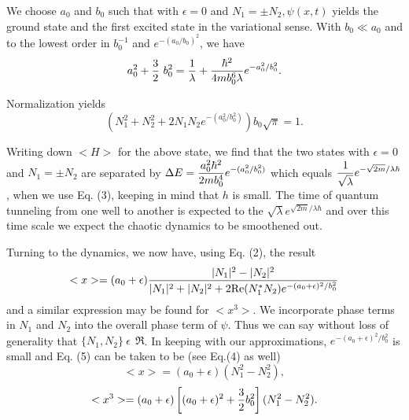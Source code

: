 We choose $a_0$ and $b_0$ such that with $\epsilon = 0$ and $N_1 = \pm 
N_2, \psi (x,t)$ yields the ground state and the first excited state
in the variational sense. With $b_0 \ll a_0$ and to the lowest order
in $b^{-1}_0$ and $e^{-(a_0/b_0)^2}$, we have 
\begin{equation}
a^2_0 + {3\over 2} \ b^2_0 = {1\over \lambda} + {\hbar^2 \over
4 m b^6_0 \lambda} e^{- a^2_0/b^2_0} .
\end{equation}

Normalization yields
\begin{equation}
(N^2_1 + N^2_2 + 2N_1 N_2 e^{- (a^2_0/b^2_0)}) b_0 \sqrt{\pi} = 
1 .
\end{equation}

Writing down $<H>$ for the above state, we find that the two states
with $\epsilon = 0$ and $N_1 = \pm N_2$ are separated by $\Delta E =
\displaystyle{{a^2_0 \hbar^2 \over 2m b_0^4} e^{-(a^2_0/b^2_0)}}$ which equals
$\displaystyle{{1\over \sqrt{\lambda}} e^{- \sqrt{2m}/\lambda\hbar}}$,
when we use 
Eq. (3), keeping in mind that $h$ is small. The time of quantum
tunneling from one well to another is expected to the $\sqrt{\lambda}
e^{\sqrt{2m}/\lambda\hbar}$ and over this time scale we expect the
chaotic dynamics to be smoothened out. 

Turning to the dynamics, we now have, using Eq. (2), the result
\begin{equation}
<x> = (a_0 + \epsilon) {|N_1|^2 - |N_2|^2 \over |N_1|^2 + |N_2|^2 + 2
{\rm Re} (N_1^\ast N_2) e^{-(a_0 +\epsilon)^2 /b_0^2}}
\end{equation}
and a similar expression may be found for $<x^3>$. We incorporate
phase terms in $N_1$ and $N_2$ into the overall phase term of
$\psi$. Thus we can say without loss of generality that $\{N_1, N_2\} \
\epsilon \ \ \Re$. In keeping with our approximations, $e^{-(a_0 
+ \epsilon)^2/b^2_0}$ is small and Eq. (5) can be taken to be (see
Eq.(4) as well)
\subequations
\begin{equation}
<x> = (a_0 + \epsilon) (N_1^2 - N_2^2) , 
\end{equation}
\begin{equation}
<x^3> = (a_0 + \epsilon) \left[(a_0 + \epsilon)^2 + {3\over 2}
b^2_0\right] (N_1^2 - N^2_2) .
\end{equation}
\endsubequations

